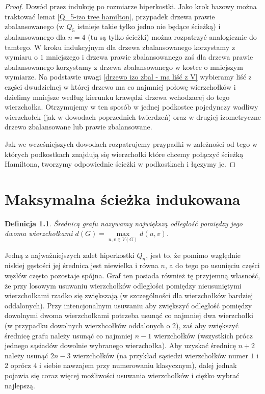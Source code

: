 \documentclass{pracamgr}
\newtheorem{defi}[theorem]{Definicja} %
\begin{document}
    \begin{proof}
     Dowód przez indukcję po rozmiarze hiperkostki. Jako krok bazowy można traktować lemat \ref{Q_5-izo tree hamilton}, przypadek drzewa prawie zbalansowanego
     (w $Q_5$ istnieje takie tylko jedno nie będące ścieżką) i zbalansowanego dla $n=4$ (tu są tylko ścieżki) można rozpatrzyć analogicznie do tamtego.
     W kroku indukcyjnym dla drzewa zbalansowanego korzystamy z wymiaru o $1$ mniejszego i drzewa prawie zbalansowanego 
     zaś dla drzewa prawie zbalansowanego korzystamy z drzewa zbalansowanego w kostce o mniejszym wymiarze.
     Na podstawie uwagi \ref{drzewo izo zbal - ma liść z V} wybieramy liść z części dwudzielnej w której drzewo
     ma co najmniej połowę wierzchołków i dzielimy mniejsze według kierunku krawędzi drzewa wchodzacej do tego wierzchołka.
     Otrzymujemy w ten sposób w jednej podkostce pojedynczy wadliwy wierzchołek (jak w dowodach poprzednich twierdzeń)
     oraz w drugiej izometryczne drzewo zbalansowane lub prawie zbalansowane.
     
     Jak we wcześniejszych dowodach rozpatrujemy przypadki w zależności od tego w których podkostkach znajdują się wierzchołki
     które chcemy połączyć ścieżką Hamiltona, tworzymy odpowiednie ścieżki w podkostkach i łączymy je.
    \end{proof}

  \chapter{Maksymalna ścieżka indukowana}
   \begin{defi}\label{srednica grafu}
    \emph{Średnicą grafu} nazywamy największą odległość pomiędzy jego dwoma wierzchołkami $d(G)=\max\limits_{u,v\in V(G)}d(u,v)$.
   \end{defi}
   Jedną z najważniejszych zalet hiperkostki $Q_n$, jest to, że pomimo względnie niskiej gęstości jej średnica jest niewielka i równa $n$,
   a do tego po usunięciu części węzłów często pozostaje spójna.
   Graf ten posiada również tę przyjemną własność, że przy losowym usuwaniu wierzchołków odległości pomiędzy nieusuniętymi wierzchołkami rzadko się zwiększają
   (w szczególności dla wierzchołków bardziej oddalonych).
   Przy intencjonalnym usuwaniu aby zwiększyć odległość pomiędzy dowolnymi dwoma wierzchołkami potrzeba usunąć co najmniej dwa wierzchołki
   (w przypadku dowolnych wierzhcołków oddalonych o 2), zaś aby zwiększyć średnicę grafu należy usunąć co najmniej $n-1$ wierzchołków
   (wszystkich prócz jednego sąsiadów dowolnie wybranego wierzchołka).
   Aby uzyskać średnicę $n+2$ należy usunąć $2n-3$ wierzchołków
   (na przykład sąsiedzi wierzchołków numer $1$ i $2$ oprócz $4$ i siebie nawzajem przy numerowaniu klasycznym),
   dalej jednak pojawia się coraz więcej możliwości usuwania wierzchołków i ciężko wybrać najlepszą.
    
\end{document}
